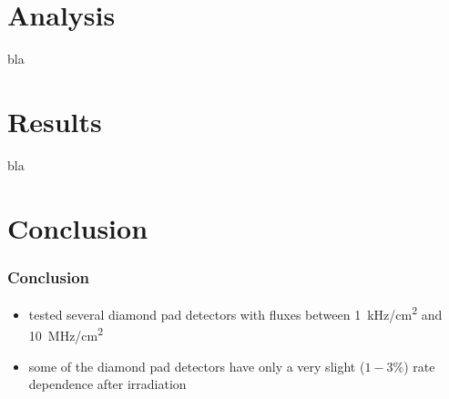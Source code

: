 \documentclass[9pt]{beamer}
\begin{document}
\section{Analysis}
\begin{frame}
	bla
\end{frame}
\section{Results}
\begin{frame}
	bla
\end{frame}
\section{Conclusion}
\begin{frame}
	\frametitle{Conclusion}
	\begin{itemize}
		\item tested several diamond pad detectors with fluxes between \SI{1}{kHz/cm^{2}} and \SI{10}{MHz/cm^{2}}
		\item some of the diamond pad detectors have only a very slight ($1-3$\%) rate dependence after irradiation
	\end{itemize}
\end{frame}
\end{document}

